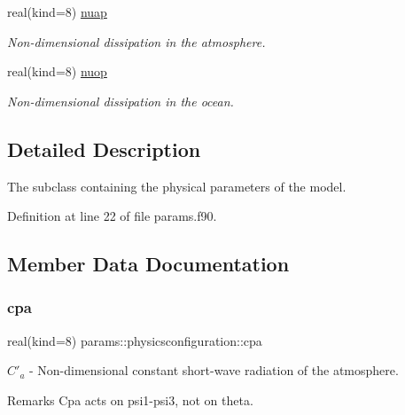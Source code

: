 \begin{DoxyCompactItemize}
\mbox{\label{structparams_1_1physicsconfiguration_a23a7473f296dc377f96313f182a0fd42}} 
real(kind=8) \hyperlink{structparams_1_1physicsconfiguration_a23a7473f296dc377f96313f182a0fd42}{nuap}
\begin{DoxyCompactList}\small\item\em Non-\/dimensional dissipation in the atmosphere. \end{DoxyCompactList}\item 
\mbox{\label{structparams_1_1physicsconfiguration_a0ca4d9d70afe045ba184833e08a057cf}} 
real(kind=8) \hyperlink{structparams_1_1physicsconfiguration_a0ca4d9d70afe045ba184833e08a057cf}{nuop}
\begin{DoxyCompactList}\small\item\em Non-\/dimensional dissipation in the ocean. \end{DoxyCompactList}\end{DoxyCompactItemize}


\subsection{Detailed Description}
The subclass containing the physical parameters of the model. 

Definition at line 22 of file params.\+f90.



\subsection{Member Data Documentation}
\mbox{\label{structparams_1_1physicsconfiguration_ac6c4cb133d64bb6ba0091e07c15c2a19}} 
\subsubsection{\texorpdfstring{cpa}{cpa}}
{\footnotesize\ttfamily real(kind=8) params\+::physicsconfiguration\+::cpa}



$C'_a$ -\/ Non-\/dimensional constant short-\/wave radiation of the atmosphere. 

\begin{DoxyRemark}{Remarks}
Cpa acts on psi1-\/psi3, not on theta. 
\end{DoxyRemark}


